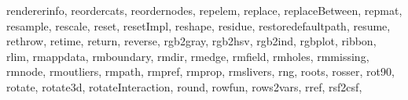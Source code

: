 {{        rendererinfo,%
        reordercats,%
        reordernodes,%
        repelem,%
        replace,%
        replaceBetween,%
        repmat,%
        resample,%
        rescale,%
        reset,%
        resetImpl,%
        reshape,%
        residue,%
        restoredefaultpath,%
        resume,%
        rethrow,%
        retime,%
        return,%
        reverse,%
        rgb2gray,%
        rgb2hsv,%
        rgb2ind,%
        rgbplot,%
        ribbon,%
        rlim,%
        rmappdata,%
        rmboundary,%
        rmdir,%
        rmedge,%
        rmfield,%
        rmholes,%
        rmmissing,%
        rmnode,%
        rmoutliers,%
        rmpath,%
        rmpref,%
        rmprop,%
        rmslivers,%
        rng,%
        roots,%
        rosser,%
        rot90,%
        rotate,%
        rotate3d,%
        rotateInteraction,%
        round,%
        rowfun,%
        rows2vars,%
        rref,%
        rsf2csf,%
}}
